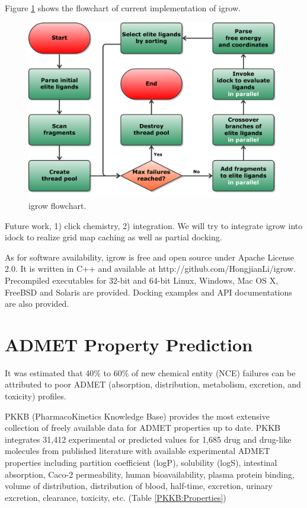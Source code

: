 Figure \ref{igrow:Flowchart} shows the flowchart of current implementation of igrow. 

\begin{figure}
\centering
\includegraphics[width=\textwidth]{igrow/Flowchart.pdf}
\caption{igrow flowchart.}
\label{igrow:Flowchart}
\end{figure}

Future work, 1) click chemistry, 2) integration.
We will try to integrate igrow into idock to realize grid map caching as well as partial docking.
 
As for software availability, igrow is free and open source under Apache License 2.0. It is written in C++ and available at http://github.com/HongjianLi/igrow. Precompiled executables for 32-bit and 64-bit Linux, Windows, Mac OS X, FreeBSD and Solaris are provided. Docking examples and API documentations are also provided.

\section{ADMET Property Prediction}

It was estimated that 40\% to 60\% of new chemical entity (NCE) failures can be attributed to poor ADMET (absorption, distribution, metabolism, excretion, and toxicity) profiles.

PKKB (PharmacoKinetics Knowledge Base) \citep{1133} provides the most extensive collection of freely available data for ADMET properties up to date. PKKB integrates 31,412 experimental or predicted values for 1,685 drug and drug-like molecules from published literature with available experimental ADMET properties including partition coefficient (logP), solubility (logS), intestinal absorption, Caco-2 permeability, human bioavailability, plasma protein binding, volume of distribution, distribution of blood, half-time, excretion, urinary excretion, clearance, toxicity, etc. (Table \ref{PKKB:Properties})

